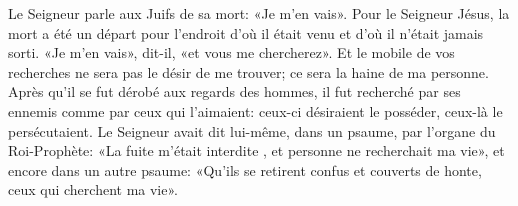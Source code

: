 Le Seigneur parle aux Juifs de sa mort:
	«Je m’en vais».
Pour le Seigneur Jésus, la mort a été un départ
		pour l’endroit d’où il était venu et d’où il n’était jamais sorti.
«Je m’en vais», dit-il, «et vous me chercherez».
Et le mobile de vos recherches ne sera pas le désir de me trouver;
	ce sera la haine de ma personne.
Après qu’il se fut dérobé aux regards des hommes,
	il fut recherché par ses ennemis comme par ceux qui l’aimaient:
	ceux-ci désiraient le posséder, ceux-là le persécutaient.
Le Seigneur avait dit lui-même, dans un psaume, par l’organe du Roi-Prophète:
	«La fuite m’était interdite , et personne ne recherchait ma vie»,
	et encore dans un autre psaume:
	«Qu’ils se retirent confus et couverts de honte, ceux qui cherchent ma vie».
